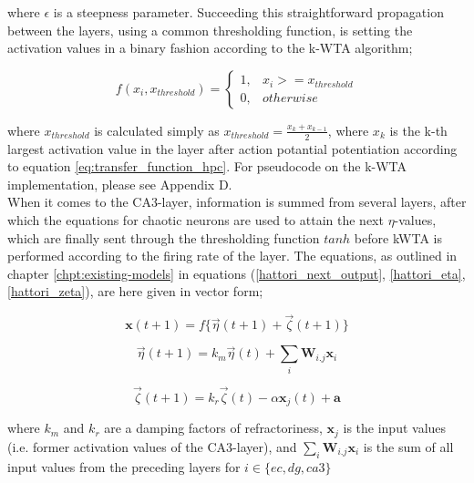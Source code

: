 where $\epsilon$ is a steepness parameter. Succeeding this straightforward propagation between the layers, using a common thresholding function, is setting the activation values in a binary fashion according to the k-WTA algorithm;

\begin{equation}
    f(x_i, x_{threshold}) = \begin{cases}
    1, & x_i >= x_{threshold} \\
    0, & otherwise
    \end{cases}
\end{equation}

where $x_{threshold}$ is calculated simply as $x_{threshold} = \frac{x_{k} + x_{k-1}}{2}$, where $x_k$ is the k-th largest activation value in the layer after action potantial potentiation according to equation \ref{eq:transfer_function_hpc}. For pseudocode on the k-WTA implementation, please see Appendix D.
\\

When it comes to the CA3-layer, information is summed from several layers, after which the equations for chaotic neurons are used to attain the next $\eta$-values, which are finally sent through the thresholding function $tanh$ before kWTA is performed according to the firing rate of the layer. The equations, as outlined in chapter \ref{chpt:existing-models} in equations (\ref{hattori_next_output}, \ref{hattori_eta}, \ref{hattori_zeta}), are here given in vector form;

\begin{equation}\label{eq:eta_zeta_sum}
    \textbf{x}(t+1) = f\{ \vec{\eta}(t+1) + \vec{\zeta}(t+1) \}
\end{equation}

\begin{equation}
    \vec{\eta}(t+1) = k_m \vec{\eta}(t) + \sum_{i} \textbf{W}_{i.j} \textbf{x}_i
\end{equation}

\begin{equation}
    \vec{\zeta}(t+1) = k_r \vec{\zeta}(t) - \alpha \textbf{x}_j(t) + \textbf{a}
\end{equation}

where $k_m$ and $k_r$ are a damping factors of refractoriness, $\textbf{x}_j$ is the input values (i.e. former activation values of the CA3-layer), and $\sum_{i} \textbf{W}_{i.j} \textbf{x}_i$ is the sum of all input values from the preceding layers for $i\in\{ec, dg, ca3\}$
\\

